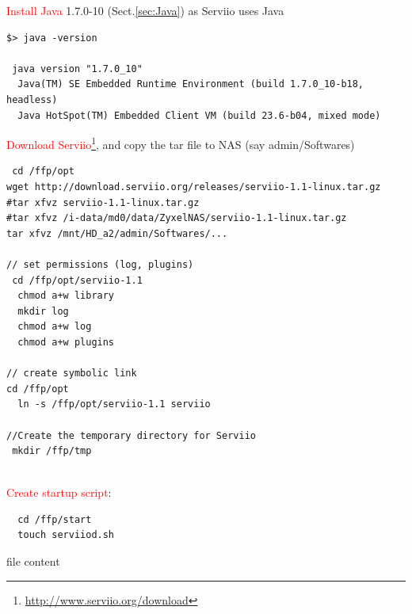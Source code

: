 \textcolor{red}{Install Java} 1.7.0-10 (Sect.\ref{sec:Java}) as Serviio uses
Java
\begin{verbatim}
$> java -version

 java version "1.7.0_10"
  Java(TM) SE Embedded Runtime Environment (build 1.7.0_10-b18, headless)
  Java HotSpot(TM) Embedded Client VM (build 23.6-b04, mixed mode)
\end{verbatim}

\textcolor{red}{Download
Serviio}\footnote{\url{http://www.serviio.org/download}}, and copy the tar file
to NAS (say admin/Softwares)

\begin{verbatim}
 cd /ffp/opt
wget http://download.serviio.org/releases/serviio-1.1-linux.tar.gz
#tar xfvz serviio-1.1-linux.tar.gz
#tar xfvz /i-data/md0/data/ZyxelNAS/serviio-1.1-linux.tar.gz
tar xfvz /mnt/HD_a2/admin/Softwares/...

// set permissions (log, plugins)
 cd /ffp/opt/serviio-1.1
  chmod a+w library
  mkdir log
  chmod a+w log
  chmod a+w plugins
  
// create symbolic link  
cd /ffp/opt
  ln -s /ffp/opt/serviio-1.1 serviio  
  
//Create the temporary directory for Serviio
 mkdir /ffp/tmp
 
\end{verbatim}

\textcolor{red}{Create startup script}:
\begin{verbatim}
  cd /ffp/start
  touch serviiod.sh  
\end{verbatim}
file content

